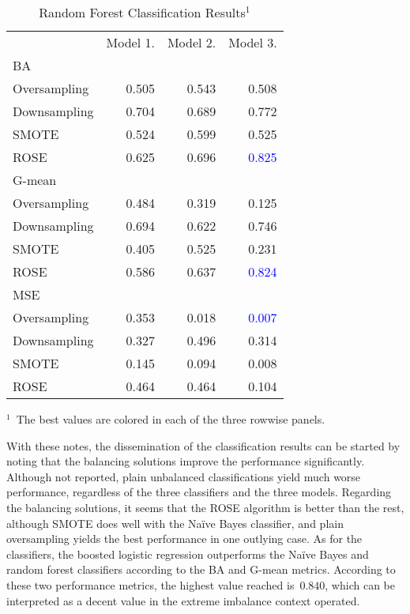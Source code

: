 \documentclass[5p, twocolumn, numbers, sort]{elsarticle}
\newcommand{\e}[1]{\textcolor{blue}{#1}}
\begin{document}
\begin{table}[th!b]
\centering
\caption{Random Forest Classification Results$^1$}
\label{tab: classification random forest}
\begin{threeparttable}
\begin{tabularx}{\linewidth}{lrrr}
\toprule
& Model 1. & Model 2. & Model 3. \\
\cmidrule{2-4}
BA \\
\cmidrule{1-1}
Oversampling & 0.505 & 0.543 & 0.508 \\
Downsampling & 0.704 & 0.689 & 0.772 \\
SMOTE & 0.524 & 0.599 & 0.525 \\
ROSE & 0.625 & 0.696 & \e{0.825} \\
\cmidrule{2-4}
G-mean \\
\cmidrule{1-1}
Oversampling & 0.484 & 0.319 & 0.125 \\
Downsampling & 0.694 & 0.622 & 0.746 \\
SMOTE & 0.405 & 0.525 & 0.231 \\
ROSE & 0.586 & 0.637 & \e{0.824} \\
\cmidrule{2-4}
MSE & \\
\cmidrule{1-1}
Oversampling & 0.353 & 0.018 & \e{0.007} \\
Downsampling & 0.327 & 0.496 & 0.314 \\
SMOTE & 0.145 & 0.094 & 0.008 \\
ROSE & 0.464 & 0.464 & 0.104 \\
\bottomrule
\end{tabularx}
\begin{tablenotes}
\begin{scriptsize}
\item{$^1$~The best values are colored in each of the three rowwise panels.}
\end{scriptsize}
\end{tablenotes}
\end{threeparttable}
\end{table}

With these notes, the dissemination of the classification results can be started
by noting that the balancing solutions improve the performance
significantly. Although not reported, plain unbalanced classifications yield
much worse performance, regardless of the three classifiers and the three
models. Regarding the balancing solutions, it seems that the ROSE algorithm is
better than the rest, although SMOTE does well with the Na\"ive Bayes
classifier, and plain oversampling yields the best performance in one outlying
case. As for the classifiers, the boosted logistic regression outperforms the
Na\"ive Bayes and random forest classifiers according to the BA and G-mean
metrics. According to these two performance metrics, the highest value reached
is~$0.840$, which can be interpreted as a decent value in the extreme imbalance
context operated.
\end{document}
